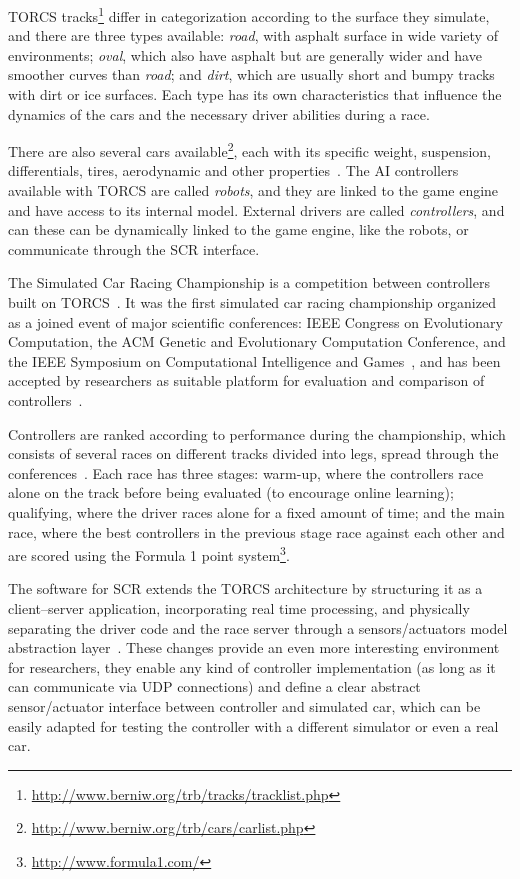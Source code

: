 \newcommand{\track}[1]{\emph{#1}}%
TORCS tracks\footnote{\url{http://www.berniw.org/trb/tracks/tracklist.php}} differ in categorization according to the surface they simulate, and there are three types available: \track{road}, with asphalt surface in wide variety of environments; \track{oval}, which also have asphalt but are generally wider and have smoother curves than \track{road}; and \track{dirt}, which are usually short and bumpy tracks with dirt or ice surfaces. Each type has its own characteristics that influence the dynamics of the cars and the necessary driver abilities during a race.

There are also several cars available\footnote{\url{http://www.berniw.org/trb/cars/carlist.php}}, each with its specific weight, suspension, differentials, tires, aerodynamic and other properties~\cite{TORCS}. The AI controllers available with TORCS are called \emph{robots}, and they are linked to the game engine and have access to its internal model. External drivers are called \emph{controllers}, and can these can be dynamically linked to the game engine, like the robots, or communicate through the SCR interface.

The Simulated Car Racing Championship is a competition between controllers built on TORCS~\cite{SCR}. It was the first simulated car racing championship organized as a joined event of major scientific conferences: IEEE Congress on Evolutionary Computation, the ACM Genetic and Evolutionary Computation Conference, and the IEEE Symposium on Computational Intelligence and Games~\cite{2009}, and has been accepted by researchers as suitable platform for evaluation and comparison of controllers~\cite{TORCS}.

Controllers are ranked according to performance during the championship, which consists of several races on different tracks divided into legs, spread through the conferences~\cite{2009}. Each race has three stages: warm-up, where the controllers race alone on the track before being evaluated (to encourage online learning); qualifying, where the driver races alone for a fixed amount of time; and the main race, where the best controllers in the previous stage race against each other and are scored using the Formula 1 point system\footnote{\url{http://www.formula1.com/}}.

The software for SCR extends the TORCS architecture by structuring it as a client–server application, incorporating real time processing, and physically separating the driver code and the race server through a sensors/actuators model abstraction layer~\cite{2009}. These changes provide an even more interesting environment for researchers, they enable any kind of controller implementation (as long as it can communicate via UDP connections) and define a clear abstract sensor/actuator interface between controller and simulated car, which can be easily adapted for testing the controller with a different simulator or even a real car.

